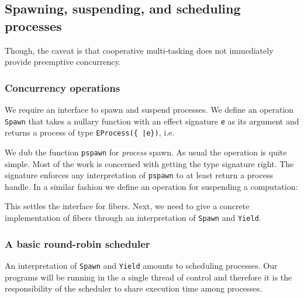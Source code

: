 \documentclass[12pt,mscres,cdtppar,twoside,openright,logo,rightchapter,normalheadings]{infthesis}
\newcommand{\snippet}[1]{}
\theoremstyle{definition}
\newcommand{\todo}[1]{{\par\noindent\small\color{red} \framebox{\parbox{\dimexpr\linewidth-2\fboxsep-2\fboxrule}{\textbf{TODO:} #1}}}}
\begin{document}
\subsection{Spawning, suspending, and scheduling processes}
\label{sec:links-model-handlers-scheduler}

\todo{Introduce fibers}
Though, the caveat is that cooperative multi-tasking does not
immediately provide preemptive concurrency. 

\subsubsection{Concurrency operations}

We require an interface to spawn and suspend processes. We define an
operation \lstinline$Spawn$ that takes a nullary function with an
effect signature \lstinline$e$ as its argument and returns a process
of type \lstinline$EProcess({ |e})$, i.e.
%
\snippet{pspawn.links}
%
We dub the function \lstinline$pspawn$ for \emph{process} spawn. As
usual the operation is quite simple. Most of the work is concerned
with getting the type signature right. The signature enforces any
interpretation of \lstinline$pspawn$ to at least return a process
handle. In a similar fashion we define an operation for suspending a
computation:
%
\snippet{yield.links}
%
This settles the interface for fibers. Next, we need to give a
concrete implementation of fibers through an interpretation of
\lstinline$Spawn$ and \lstinline$Yield$.

\subsubsection{A basic round-robin scheduler}

An interpretation of \lstinline$Spawn$ and \lstinline$Yield$ amounts
to scheduling processes. Our programs will be running in the a single
thread of control and therefore it is the responsibility of the
scheduler to share execution time among processes.
\end{document}
